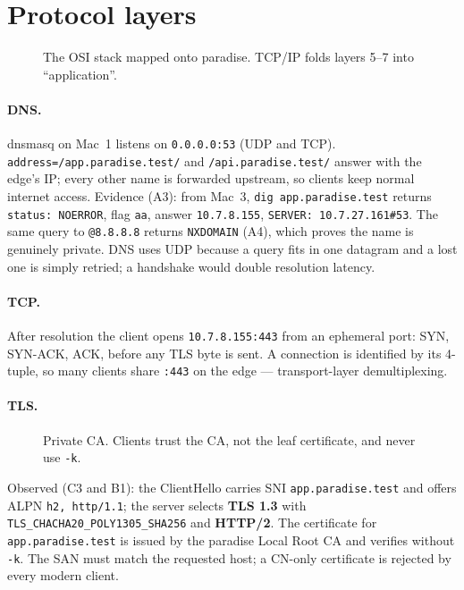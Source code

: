 \documentclass[11pt,a4paper]{article}
\begin{document}
\section{Protocol layers}

\begin{figure}[H]
\centering
\drawOsi
\caption{The OSI stack mapped onto paradise. TCP/IP folds layers 5--7 into ``application''.}
\end{figure}

\paragraph{DNS.}
dnsmasq on Mac~1 listens on \texttt{0.0.0.0:53} (UDP and TCP). \texttt{address=/app.paradise.test/}
and \texttt{/api.paradise.test/} answer with the edge's IP; every other name is forwarded
upstream, so clients keep normal internet access. Evidence (A3): from Mac~3,
\texttt{dig app.paradise.test} returns \texttt{status: NOERROR}, flag \texttt{aa}, answer
\texttt{10.7.8.155}, \texttt{SERVER: 10.7.27.161\#53}. The same query to \texttt{@8.8.8.8} returns
\texttt{NXDOMAIN} (A4), which proves the name is genuinely private.
DNS uses UDP because a query fits in one datagram and a lost one is simply retried; a handshake
would double resolution latency.

\paragraph{TCP.}
After resolution the client opens \texttt{10.7.8.155:443} from an ephemeral port:
SYN, SYN-ACK, ACK, before any TLS byte is sent. A connection is identified by its 4-tuple,
so many clients share \texttt{:443} on the edge --- transport-layer demultiplexing.

\paragraph{TLS.}
\begin{figure}[!htbp]
\centering
\drawTls
\caption{Private CA. Clients trust the CA, not the leaf certificate, and never use \texttt{-k}.}
\end{figure}

Observed (C3 and B1): the ClientHello carries SNI \texttt{app.paradise.test} and offers ALPN
\texttt{h2, http/1.1}; the server selects \textbf{TLS 1.3} with
\texttt{TLS\_CHACHA20\_POLY1305\_SHA256} and \textbf{HTTP/2}. The certificate for
\texttt{app.paradise.test} is issued by the paradise Local Root CA and verifies without \texttt{-k}.
The SAN must match the requested host; a CN-only certificate is rejected by every modern client.
\end{document}
